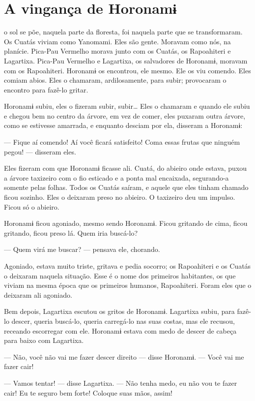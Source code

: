 \chapter{A vingança de Horonamɨ}
 
 o sol se põe, naquela parte da floresta, foi naquela parte que se
transformaram. Os Cuatás viviam como Yanomami. Eles são gente.
Moravam como nós, na planície. Pica-Pau Vermelho morava junto com os
Cuatás, os Rapoahiteri e Lagartixa. Pica-Pau Vermelho e
Lagartixa, os salvadores de Horonamɨ, moravam com os Rapoahiteri.
Horonamɨ os encontrou, ele mesmo. Ele os viu comendo. Eles comiam abios.
Eles o chamaram, ardilosamente, para subir; provocaram o encontro
para fazê-lo gritar.

Horonamɨ subiu, eles o fizeram subir, subir… Eles o chamaram e
quando ele subiu e chegou bem no centro da árvore, em vez de comer, eles
puxaram outra árvore, como se estivesse amarrada, e enquanto desciam por
ela, disseram a Horonamɨ:

--- Fique aí comendo! Aí você ficará satisfeito! Coma essas frutas que
ninguém pegou! --- disseram eles.

Eles fizeram com que Horonamɨ ficasse ali. Cuatá, do abieiro onde
estava, puxou a árvore taxizeiro com o fio esticado e a ponta mal
encaixada, segurando-a somente pelas folhas. Todos os Cuatás saíram, e
aquele que eles tinham chamado ficou sozinho. Eles o deixaram preso no
abieiro. O taxizeiro deu um impulso. Ficou só o abieiro. 

Horonamɨ ficou agoniado, mesmo sendo Horonamɨ. Ficou gritando de cima,
ficou gritando, ficou preso lá. Quem iria buscá-lo? 

--- Quem virá me buscar? --- pensava ele, chorando. 

Agoniado, estava muito triste, gritava e pedia socorro;
os Rapoahiteri e os Cuatás o deixaram naquela
situação. Esse é o nome dos primeiros habitantes, os que viviam
na mesma época que os primeiros humanos, Rapoahiteri. Foram eles que o
deixaram ali agoniado. 

Bem depois, Lagartixa escutou os gritos de Horonamɨ. Lagartixa subiu,
para fazê-lo descer, queria buscá-lo, queria carregá-lo nas suas costas,
mas ele recusou, receando escorregar com ele. Horonamɨ estava com medo
de descer de cabeça para baixo com Lagartixa. 

--- Não, você não vai me fazer descer direito --- disse
Horonamɨ. --- Você vai me fazer cair! 

--- Vamos tentar! --- disse Lagartixa. --- Não tenha medo, eu não vou te
fazer cair! Eu te seguro bem forte! Coloque suas mãos, assim! 

